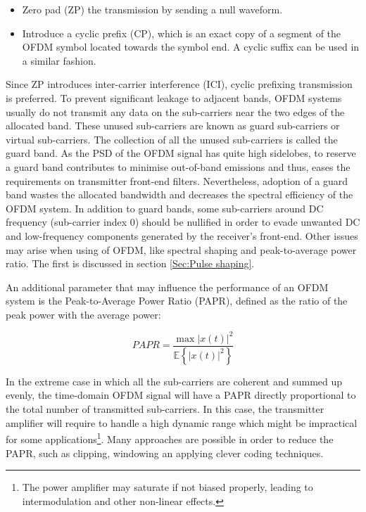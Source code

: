 \documentclass[12pt,a4paper,openright]{report}
\begin{document}
\begin{itemize}
\item Zero pad (ZP) the transmission by sending a null waveform.

\item Introduce a cyclic prefix (CP), which is an exact copy of a segment of the OFDM symbol located towards the symbol end. A cyclic suffix can be used in a similar fashion.

\end{itemize}
Since ZP introduces inter-carrier interference (ICI), cyclic prefixing transmission is preferred. 
To prevent significant leakage to adjacent bands, OFDM systems usually do not transmit any data on the sub-carriers near the two edges of the allocated band. These unused sub-carriers are known as guard sub-carriers or virtual sub-carriers. The collection of all the unused sub-carriers is called the guard band. As the PSD of the OFDM signal has quite high sidelobes, to reserve a guard band contributes to minimise out-of-band emissions and thus, eases the requirements on transmitter front-end filters. Nevertheless, adoption of a guard band wastes the allocated bandwidth and decreases the spectral efficiency of the OFDM system. In addition to guard bands, some sub-carriers around DC frequency (sub-carrier index 0) should be nullified in order to evade unwanted DC and low-frequency components generated by the receiver's front-end. Other issues may arise when using of OFDM, like spectral shaping and peak-to-average power ratio. The first is discussed in section \ref{Sec:Pulse shaping}. 


An additional parameter that may influence the performance of an OFDM system is the Peak-to-Average Power Ratio (PAPR), defined as the ratio of the peak power with the average power:

\begin{equation}
PAPR = \frac{{\max {{\left| {x(t)} \right|}^2}}}{{\mathbb{E}\left\{ {{{\left| {x(t)} \right|}^2}} \right\}}}
\end{equation}

In the extreme case in which all the sub-carriers are coherent and summed up evenly, the time-domain OFDM signal will have a PAPR directly proportional to the total number of transmitted sub-carriers. In this case, the transmitter amplifier will require to handle a high dynamic range which might be impractical for some applications\footnote{The power amplifier may saturate if not biased properly, leading to intermodulation and other non-linear effects.}. Many approaches are possible in order to reduce the PAPR, such as clipping, windowing an applying clever coding techniques.     
\end{document}
